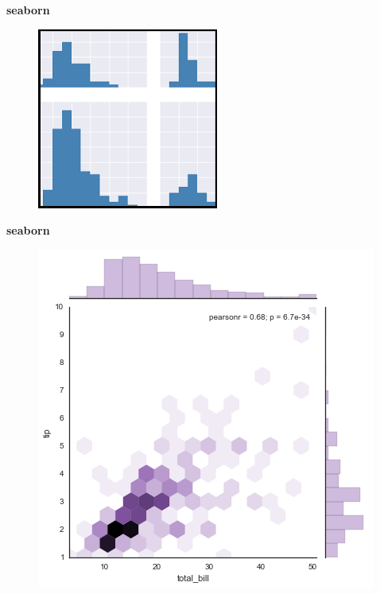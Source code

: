\documentclass[MASTER.tex]{subfiles}
\begin{document}
\begin{frame}
		\Large
		\textbf{seaborn}
		
	\begin{figure}
		\centering
		\includegraphics[width=0.80\linewidth]{seaborn3}		
	\end{figure}
\end{frame}

\begin{frame}
		\Large
		\textbf{seaborn}
		
	\begin{figure}
		\centering
		\includegraphics[width=0.80\linewidth]{seaborn4}
		
	\end{figure}
\end{frame}
\end{document}
